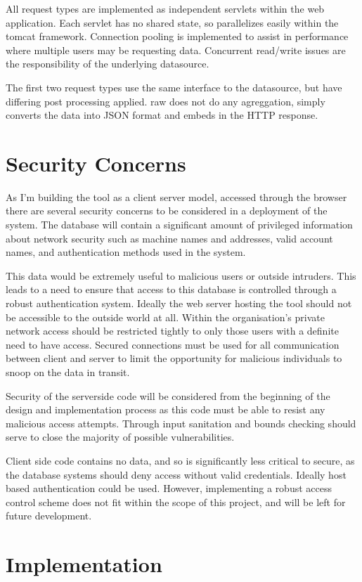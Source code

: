 All request types are implemented as independent servlets within the web application. Each servlet has no shared state, so parallelizes easily within the tomcat framework. Connection pooling is implemented to assist in performance where multiple users may be requesting data. Concurrent read/write issues are the responsibility of the underlying datasource.

The first two request types use the same interface to the datasource, but have differing post processing applied. raw does not do any agreggation, simply converts the data into JSON format and embeds in the HTTP response. 

\section{Security Concerns}
As I'm building the tool as a client server model, accessed through the browser
there are several security concerns to be considered in a deployment of the system.
The database will contain a significant amount of privileged information about network security
such as machine names and addresses, valid account names, and authentication methods used in the system.

This data would be extremely useful to malicious users or outside intruders. 
This leads to a need to ensure that access to this database is controlled through a robust authentication system.
Ideally the web server hosting the tool should not be accessible to the outside world at all. Within the organisation's private network access should be restricted tightly to only those users with a definite need to have access. 
Secured connections must be used for all communication between client and server to limit the opportunity for malicious individuals to snoop on the data in transit.

Security of the serverside code will be considered from the beginning of the design and implementation process
as this code must be able to resist any malicious access attempts. Through input sanitation and bounds checking should serve to close the majority of possible vulnerabilities.

Client side code contains no data, and so is significantly less critical to secure, as the database systems should deny access without valid credentials. Ideally host based authentication could be used. However, implementing a robust access control scheme does not fit within the scope of this project, and will be left for future development.

\section{Implementation}

